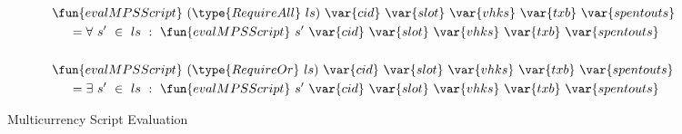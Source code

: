 \begin{figure*}[htb]
\begin{align*}
    &\fun{evalMPSScript}~(\type{RequireAll}~ls)~\var{cid}~\var{slot}~\var{vhks}
    ~\var{txb}~\var{spentouts}
   \\
    &~~~~ = \forall ~s'~ \in~ ls~:~\fun{evalMPSScript}~s'~\var{cid}~\var{slot}~\var{vhks}
    ~\var{txb}~\var{spentouts}\\~\\
    &\fun{evalMPSScript}~(\type{RequireOr}~ls)~\var{cid}~\var{slot}~\var{vhks}
    ~\var{txb}~\var{spentouts}
   \\
    &~~~~ = \exists ~s'~ \in~ ls~:~\fun{evalMPSScript}~s'~\var{cid}~\var{slot}~\var{vhks}
    ~\var{txb}~\var{spentouts}\\
  \end{align*}
  \caption{Multicurrency Script Evaluation}
  \label{fig:defs:tx-mc-eval}
\end{figure*}



